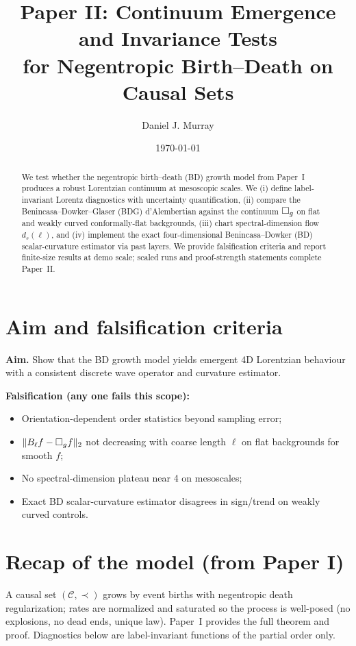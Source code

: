 \title{Paper II: Continuum Emergence and Invariance Tests\\
for Negentropic Birth--Death on Causal Sets}
\author{Daniel J. Murray}
\date{\today}


\maketitle

\begin{abstract}
We test whether the negentropic birth--death (BD) growth model from Paper~I produces a robust Lorentzian continuum at mesoscopic scales.
We (i) define label-invariant Lorentz diagnostics with uncertainty quantification, (ii) compare the Benincasa--Dowker--Glaser (BDG) d'Alembertian against the continuum $\Box_g$ on flat and weakly curved conformally-flat backgrounds, (iii) chart spectral-dimension flow $d_s(\ell)$, and (iv) implement the exact four-dimensional Benincasa--Dowker (BD) scalar-curvature estimator via past layers.
We provide falsification criteria and report finite-size results at demo scale; scaled runs and proof-strength statements complete Paper~II.
\end{abstract}

\section{Aim and falsification criteria}
\textbf{Aim.} Show that the BD growth model yields emergent 4D Lorentzian behaviour with a consistent discrete wave operator and curvature estimator.

\medskip\noindent\textbf{Falsification (any one fails this scope):}
\begin{itemize}
\item Orientation-dependent order statistics beyond sampling error;
\item $\|B_\ell f - \Box_g f\|_2$ not decreasing with coarse length $\ell$ on flat backgrounds for smooth $f$;
\item No spectral-dimension plateau near 4 on mesoscales;
\item Exact BD scalar-curvature estimator disagrees in sign/trend on weakly curved controls.
\end{itemize}

\section{Recap of the model (from Paper I)}
A causal set $(\mathcal{C},\prec)$ grows by event births with negentropic death regularization; rates are normalized and saturated so the process is well-posed (no explosions, no dead ends, unique law). Paper~I provides the full theorem and proof.
Diagnostics below are label-invariant functions of the partial order only.


